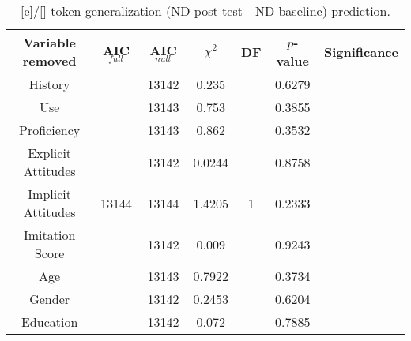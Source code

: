 \begin{table}
\centering
 \begin{tabular}{|c||c|c|c|c|c|c|} 
 \hline
 \textbf{Variable removed} & \textbf{AIC$_{full}$} & \textbf{AIC$_{null}$} & $\chi^2$ & \textbf{DF} & \textbf{$p$-value} & \textbf{Significance}\\ [0.5ex] 
 \hline
  History & \multirow{9}{*}{13144} & 13142 & 0.235 & \multirow{9}{*}{1} & 0.6279 & \\ 
 \cline{1-1}\cline{3-4}\cline{6-7}
 Use &  & 13143 & 0.753 &  & 0.3855 & \\
 \cline{1-1}\cline{3-4}\cline{6-7}
 Proficiency &  & 13143 & 0.862 &  & 0.3532 & \\
 \cline{1-1}\cline{3-4}\cline{6-7}
 Explicit Attitudes &  & 13142 & 0.0244 &  & 0.8758 & \\
 \cline{1-1}\cline{3-4}\cline{6-7}
 Implicit Attitudes &  & 13144 & 1.4205 &  & 0.2333 & \\
 \cline{1-1}\cline{3-4}\cline{6-7}
 Imitation Score &  & 13142 & 0.009 &  & 0.9243 & \\
 \cline{1-1}\cline{3-4}\cline{6-7}
 Age &  & 13143 & 0.7922 &  & 0.3734 & \\
 \cline{1-1}\cline{3-4}\cline{6-7}
 Gender &  & 13142 & 0.2453 &  & 0.6204 & \\
 \cline{1-1}\cline{3-4}\cline{6-7}
 Education &  & 13142 & 0.072 &  & 0.7885 & \\
 \hline
\end{tabular}
\caption{[e]/[] token generalization (ND post-test - ND baseline) prediction.}
\label{tab:IEtokengnPredictors}
\end{table}

